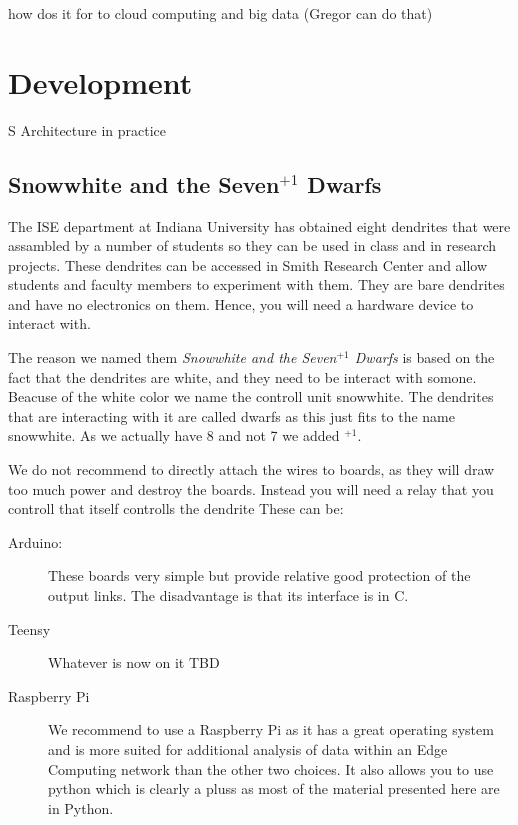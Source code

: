 how dos it for to cloud computing and big data (Gregor can do that)


\section{Development}
S Architecture in practice


\subsection{Snowwhite and the Seven$^{+1}$ Dwarfs}

The ISE department at Indiana University has obtained eight dendrites
that were assambled by a number of students so they can be used in
class and in research projects. These dendrites can be accessed in
Smith Research Center and allow students and faculty members to
experiment with them. They are bare dendrites and have no
electronics on them. Hence, you will need a hardware device to
interact with.

The reason we named them \textit{Snowwhite and the Seven$^{+1}$ Dwarfs}
is based on the fact that the dendrites are white, and they need to be
interact with  somone. Beacuse of the white color we name the controll
unit snowwhite. The dendrites that are interacting with it are called
dwarfs as this just fits to the name snowwhite. As we actually have 8
and not 7 we added $^{+1}$.


We do not recommend to directly attach the
wires to boards, as they will draw too much power and destroy the
boards. Instead you will need a relay that you controll that itself
controlls the dendrite These can be:

\begin{description}

\item[Arduino:] These boards very simple but provide relative good
  protection of the output links. The disadvantage is that its
  interface is in C.

\item[Teensy] Whatever is now on it TBD

\item[Raspberry Pi] We recommend to use a Raspberry Pi as it has a
  great operating system and is more suited for additional analysis of
  data within an Edge Computing network than the other two choices. It
  also allows you to use python which is clearly a pluss as most of
  the material presented here are in Python.

\end{description}


